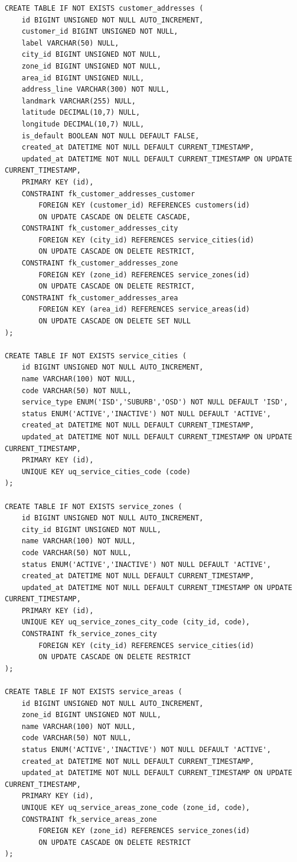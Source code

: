 \documentclass[11pt,a4paper]{article}
\begin{document}
\begin{lstlisting}
CREATE TABLE IF NOT EXISTS customer_addresses (
    id BIGINT UNSIGNED NOT NULL AUTO_INCREMENT,
    customer_id BIGINT UNSIGNED NOT NULL,
    label VARCHAR(50) NULL,
    city_id BIGINT UNSIGNED NOT NULL,
    zone_id BIGINT UNSIGNED NOT NULL,
    area_id BIGINT UNSIGNED NULL,
    address_line VARCHAR(300) NOT NULL,
    landmark VARCHAR(255) NULL,
    latitude DECIMAL(10,7) NULL,
    longitude DECIMAL(10,7) NULL,
    is_default BOOLEAN NOT NULL DEFAULT FALSE,
    created_at DATETIME NOT NULL DEFAULT CURRENT_TIMESTAMP,
    updated_at DATETIME NOT NULL DEFAULT CURRENT_TIMESTAMP ON UPDATE CURRENT_TIMESTAMP,
    PRIMARY KEY (id),
    CONSTRAINT fk_customer_addresses_customer
        FOREIGN KEY (customer_id) REFERENCES customers(id)
        ON UPDATE CASCADE ON DELETE CASCADE,
    CONSTRAINT fk_customer_addresses_city
        FOREIGN KEY (city_id) REFERENCES service_cities(id)
        ON UPDATE CASCADE ON DELETE RESTRICT,
    CONSTRAINT fk_customer_addresses_zone
        FOREIGN KEY (zone_id) REFERENCES service_zones(id)
        ON UPDATE CASCADE ON DELETE RESTRICT,
    CONSTRAINT fk_customer_addresses_area
        FOREIGN KEY (area_id) REFERENCES service_areas(id)
        ON UPDATE CASCADE ON DELETE SET NULL
);

CREATE TABLE IF NOT EXISTS service_cities (
    id BIGINT UNSIGNED NOT NULL AUTO_INCREMENT,
    name VARCHAR(100) NOT NULL,
    code VARCHAR(50) NOT NULL,
    service_type ENUM('ISD','SUBURB','OSD') NOT NULL DEFAULT 'ISD',
    status ENUM('ACTIVE','INACTIVE') NOT NULL DEFAULT 'ACTIVE',
    created_at DATETIME NOT NULL DEFAULT CURRENT_TIMESTAMP,
    updated_at DATETIME NOT NULL DEFAULT CURRENT_TIMESTAMP ON UPDATE CURRENT_TIMESTAMP,
    PRIMARY KEY (id),
    UNIQUE KEY uq_service_cities_code (code)
);

CREATE TABLE IF NOT EXISTS service_zones (
    id BIGINT UNSIGNED NOT NULL AUTO_INCREMENT,
    city_id BIGINT UNSIGNED NOT NULL,
    name VARCHAR(100) NOT NULL,
    code VARCHAR(50) NOT NULL,
    status ENUM('ACTIVE','INACTIVE') NOT NULL DEFAULT 'ACTIVE',
    created_at DATETIME NOT NULL DEFAULT CURRENT_TIMESTAMP,
    updated_at DATETIME NOT NULL DEFAULT CURRENT_TIMESTAMP ON UPDATE CURRENT_TIMESTAMP,
    PRIMARY KEY (id),
    UNIQUE KEY uq_service_zones_city_code (city_id, code),
    CONSTRAINT fk_service_zones_city
        FOREIGN KEY (city_id) REFERENCES service_cities(id)
        ON UPDATE CASCADE ON DELETE RESTRICT
);

CREATE TABLE IF NOT EXISTS service_areas (
    id BIGINT UNSIGNED NOT NULL AUTO_INCREMENT,
    zone_id BIGINT UNSIGNED NOT NULL,
    name VARCHAR(100) NOT NULL,
    code VARCHAR(50) NOT NULL,
    status ENUM('ACTIVE','INACTIVE') NOT NULL DEFAULT 'ACTIVE',
    created_at DATETIME NOT NULL DEFAULT CURRENT_TIMESTAMP,
    updated_at DATETIME NOT NULL DEFAULT CURRENT_TIMESTAMP ON UPDATE CURRENT_TIMESTAMP,
    PRIMARY KEY (id),
    UNIQUE KEY uq_service_areas_zone_code (zone_id, code),
    CONSTRAINT fk_service_areas_zone
        FOREIGN KEY (zone_id) REFERENCES service_zones(id)
        ON UPDATE CASCADE ON DELETE RESTRICT
);


\end{lstlisting}
\end{document}
